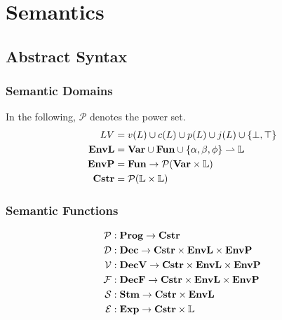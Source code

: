 
\newcommand{\iDec}{\mathbf{Dec}}

\newcommand{\iP}{\mathcal{P}}
\newcommand{\iD}{\mathcal{D}}
\newcommand{\iV}{\mathcal{V}}
\newcommand{\iF}{\mathcal{F}}
\newcommand{\iS}{\mathcal{S}}
\newcommand{\iE}{\mathcal{E}}
\newcommand{\iL}{\mathcal{L}}
\newcommand{\iO}{\mathcal{O}}

\newcommand{\dblSq}[1]{[\![ #1 ]\!]}

\section{Semantics}

\subsection{Abstract Syntax}

\subsubsection{Semantic Domains}
In the following, $\mathcal P$ denotes the power set.
\begin{align*}
LV      & = v(L) \cup c(L) \cup p(L) \cup j(L) \cup \{ \bot, \top \} \\
\mathbf{EnvL}  & = \mathbf{Var} \cup \mathbf{Fun} \cup \{ \alpha, \beta, \phi \} \rightharpoonup \mathbb{L} \\
\mathbf{EnvP}  & = \mathbf{Fun} \rightarrow \mathcal{P}(\mathbf{Var} \times \mathbb{L}) \\
\mathbf{Cstr}  & = \mathcal P (\mathbb{L} \times \mathbb{L})
\end{align*}

\subsubsection{Semantic Functions}
\begin{align*}
\iP & : \iProg \rightarrow \iCstr \\
\iD & : \iDec \rightarrow \iCstr \times \iEnvL \times \iEnvP \\
\iV & : \iDecv \rightarrow \iCstr \times \iEnvL \times \iEnvP \\
\iF & : \iDecf \rightarrow \iCstr \times \iEnvL \times \iEnvP \\
\iS & : \iStm \rightarrow \iCstr \times \iEnvL \\
\iE & : \iExp \rightarrow \iCstr \times \mathbb{L} \\
\end{align*}

